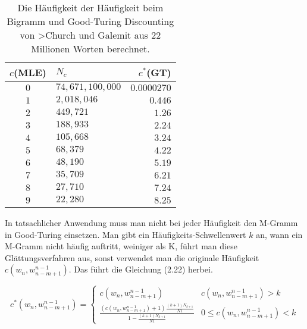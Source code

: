 \begin{table}[h]
  \begin{center}
    \begin{tabular}{clr}
      \toprule
      \bf $c$(MLE) & \bf $N_{c}$ & \bf $c^{*}$(GT)\\      
      \midrule
      $0$ &  $74,671,100,000$ & $0.0000270$  \\
      $1$ &  $2,018,046$ 			& $0.446$  \\
      $2$ &  $449,721$ 				& $1.26$  \\
      $3$ &  $188,933$ 				& $2.24$  \\
      $4$ &  $105,668$ 				& $3.24$  \\
      $5$ &  $68,379$ 				& $4.22$  \\
      $6$ &  $48,190$ 				& $5.19$  \\
      $7$ &  $35,709$ 				& $6.21$  \\
      $8$ &  $27,710$ 				& $7.24$  \\
      $9$ &  $22,280$ 				& $8.25$  \\
      \bottomrule
    \end{tabular}
  \end{center}
\caption{Die H\"aufigkeit der H\"aufigkeit beim Bigramm und Good-Turing Discounting von >Church und Galemit aus 22 Millionen Worten berechnet.}
\label{tab:table_1}
\end{table}

In tatsachlicher Anwendung muss man nicht bei jeder H\"aufigkeit den M-Gramm in Good-Turing einsetzen. Man gibt ein H\"aufigkeits-Schwellenwert $k$ an, wann ein M-Gramm nicht h\"aufig auftritt, weiniger als K, f\"uhrt man diese Gl\"attungsverfahren aus, sonst verwendet man die originale H\"aufigkeit $c(w_{n},w_{n-m+1}^{n-1})$. Das f\"uhrt die Gleichung (2.22) herbei.

\begin{equation}
\label{equationo:witten_bell_04}
c^{*}(w_{n},w_{n-m+1}^{n-1})=\begin{cases}
c(w_{n},w_{n-m+1}^{n-1}) & c(w_{n},w_{n-m+1}^{n-1})>k \\
\frac{(c(w_{n},w_{n-m+1}^{n-1})+1)\frac{(k+1)N_{k+1}}{N{1}}}{1-\frac{(k+1)N_{k+1}}{N{1}}} & 0 \leq c(w_{n},w_{n-m+1}^{n-1})<k 
\end{cases}
\end{equation}